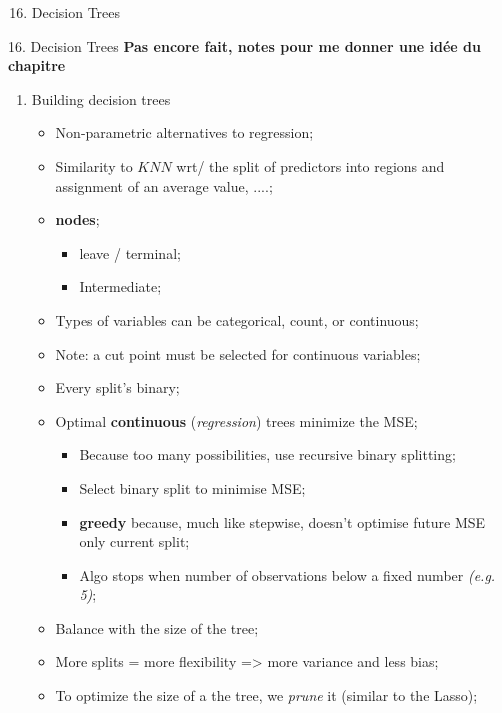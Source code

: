 \documentclass[12pt, titlepage, french]{report}
\begin{document}
\begin{ASM_chapter}
\begin{enumerate}
  \setcounter{enumi}{15}
	\item	Decision Trees
\end{enumerate}
\end{ASM_chapter}

\begin{CHPT_SUMM}{16. Decision Trees}
\textbf{Pas encore fait, notes pour me donner une idée du chapitre}
\begin{enumerate}
	\item	Building decision trees
	\begin{itemize}
		\item	Non-parametric alternatives to regression;
		\item	Similarity to $KNN$ wrt/ the split of predictors into regions and assignment of an average value, ....;
		\item	\textbf{nodes};
		\begin{itemize}
			\item	leave / terminal;
			\item	Intermediate;
		\end{itemize}
		\item	Types of variables can be categorical, count, or continuous;
		\item[]	Note: a cut point must be selected for continuous variables;
		\item	Every split's binary;
		\item	Optimal \textbf{continuous} (\textit{regression}) trees minimize the MSE;
		\begin{itemize}
			\item	Because too many possibilities, use recursive binary splitting;
			\item	Select binary split to minimise MSE;
			\item	\textbf{greedy} because, much like stepwise, doesn't optimise future MSE only current split;
			\item	Algo stops when number of observations below a fixed number \textit{(e.g. 5)};
		\end{itemize}
		\item	Balance with the size of the tree;
		\item[]	More splits = more flexibility => more variance and less bias;
		\item	To optimize the size of a the tree, we \textit{prune} it (similar to the Lasso);
		\begin{itemize}

\end{itemize}
\end{itemize}
\end{enumerate}
\end{CHPT_SUMM}
\end{document}
